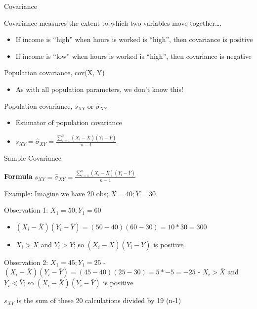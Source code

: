 \documentclass[
  8pt,
  ignorenonframetext,
  dvipsnames]{beamer}
\providecommand{\tightlist}{%
  \setlength{\itemsep}{0pt}\setlength{\parskip}{0pt}}
\renewcommand{\textbf}[1]{{\color{darkgray}\bfseries\fontfamily{Montserrat-TOsF}#1}}
\let\olditem\item
\renewcommand{\item}{%
  \olditem\vspace{4pt}
}
\begin{document}
\begin{frame}{Covariance}
\protect\hypertarget{covariance}{}

Covariance measures the extent to which two variables move
together\ldots.

\begin{itemize}
\tightlist
\item
  If income is ``high'' when hours is worked is ``high'', then
  covariance is positive
\item
  If income is ``low'' when hours is worked is ``high'', then covariance
  is negative
\end{itemize}

\medskip

Population covariance, cov(X, Y)

\begin{itemize}
\tightlist
\item
  As with all population parameters, we don't know this!
\end{itemize}

\medskip

Population covariance, \(s_{XY}\) or \(\hat{\sigma}_{XY}\)

\begin{itemize}
\item
  Estimator of population covariance
\item
  \(s_{XY}= \hat{\sigma}_{XY}=\frac{\sum_{i=1}^{n}\left(X_{i}-\bar{X} \right) \left( Y_{i}-\bar{Y} \right)}{n-1}\)
\end{itemize}

\end{frame}

\begin{frame}{Sample Covariance}
\protect\hypertarget{sample-covariance}{}

\textbf{Formula}
\(s_{XY}= \hat{\sigma}_{XY}=\frac{\sum_{i=1}^{n}\left(X_{i}-\bar{X} \right) \left( Y_{i}-\bar{Y} \right)}{n-1}\)

\medskip

Example: Imagine we have 20 obs; \(\bar{X}=40; \bar{Y}=30\)

\medskip

Observation 1: \(X_1=50; Y_1=60\)

\begin{itemize}
\tightlist
\item
  \((X_{i}-\bar{X})( Y_{i}-\bar{Y})=(50-40)(60-30)=10*30=300\)
\item
  \(X_i > \bar{X}\) and \(Y_i > \bar{Y}\); so
  \((X_{i}-\bar{X})( Y_{i}-\bar{Y})\) is positive
\end{itemize}

Observation 2: \(X_1=45; Y_1=25\) -
\((X_{i}-\bar{X})( Y_{i}-\bar{Y})=(45-40)(25-30)=5*-5=-25\) -
\(X_i > \bar{X}\) and \(Y_i < \bar{Y}\); so
\((X_{i}-\bar{X})( Y_{i}-\bar{Y})\) is positive

\medskip

\(s_{XY}\) is the sum of these 20 calculations divided by 19 (n-1)

\end{frame}
\end{document}
